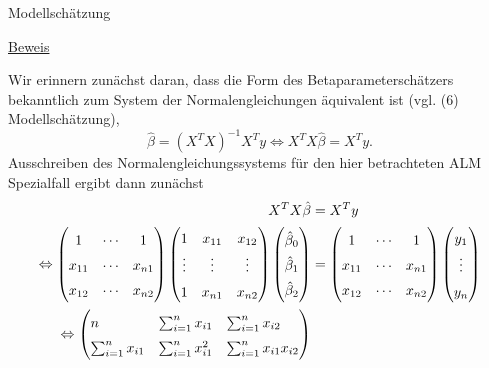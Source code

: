 \documentclass[
  8pt,
  ignorenonframetext,
]{beamer}
\begin{document}
\begin{frame}{Modellschätzung}
\protect\hypertarget{modellschuxe4tzung-4}{}
\footnotesize

\underline{Beweis}

Wir erinnern zunächst daran, dass die Form des Betaparameterschätzers
bekanntlich zum System der Normalengleichungen äquivalent ist (vgl. (6)
Modellschätzung), \begin{equation}
\hat{\beta} = (X^TX)^{-1}X^Ty \Leftrightarrow X^TX\hat{\beta} = X^Ty.
\end{equation} Ausschreiben des Normalengleichungssystems für den hier
betrachteten ALM Spezialfall ergibt dann zunächst \tiny \begin{align*}
\renewcommand{\arraystretch}{1.5}
\begin{split}
X^TX\hat{\beta} & = X^Ty
\\\Leftrightarrow
\begin{pmatrix}
1      & \cdots & 1      \\
x_{11} & \cdots & x_{n1} \\
x_{12} & \cdots & x_{n2} \\
\end{pmatrix}
\begin{pmatrix}
1      & x_{11} & x_{12} \\
\vdots & \vdots & \vdots \\
1      & x_{n1} & x_{n2} \\
\end{pmatrix}
\begin{pmatrix}
\hat{\beta}_0 \\
\hat{\beta}_1 \\
\hat{\beta}_2 \\
\end{pmatrix}
& =
\begin{pmatrix}
1      & \cdots & 1      \\
x_{11} & \cdots & x_{n1} \\
x_{12} & \cdots & x_{n2} \\
\end{pmatrix}
\begin{pmatrix}
y_1    \\
\vdots \\
y_n
\end{pmatrix}
\\\Leftrightarrow
\begin{pmatrix*}[l]
n                   & \sum_{i=1}^n x_{i1}       & \sum_{i=1}^n x_{i2}       \\
\sum_{i=1}^n x_{i1} & \sum_{i=1}^n x_{i1}^2     & \sum_{i=1}^n x_{i1}x_{i2} \\

\end{pmatrix*}
\end{split}
\end{align*}
\end{frame}
\end{document}
